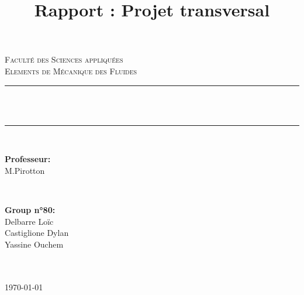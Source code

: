\documentclass{article}
\author{}
\title{Rapport : Projet transversal  }											%
\makeatletter
\let\thetitle\@title
\makeatother
\begin{document}
\begin{titlepage}
	\centering
    \vspace*{0.5 cm}
    
    \textsc{\LARGE \newline\newline Faculté des Sciences appliquées}\\[2.0 cm]	%
	\textsc{\Large Elements de Mécanique des Fluides}\\[0.5 cm]				%
	\rule{\linewidth}{0.2 mm} \\[0.4 cm]
	{ \huge \bfseries \thetitle}\\
	\rule{\linewidth}{0.2 mm} \\[1.5 cm]
	
	\begin{minipage}{0.5\textwidth}
		\begin{flushleft} \large
			\textbf{Professeur:}\\
		M.Pirotton\\
			\end{flushleft}
			\end{minipage}~
			\begin{minipage}{0.4\textwidth}
            
			\begin{flushright} \large
			\textbf{Group n°80:} \\
			Delbarre Loïc\\
\hspace{-1cm}Castiglione Dylan\\
 Yassine Ouchem\\
    \monthname\ \the\year
  \end{flushright}
        
	\end{minipage}\\[2 cm]
\today
 \end{titlepage}
\pagebreak
\end{document}
